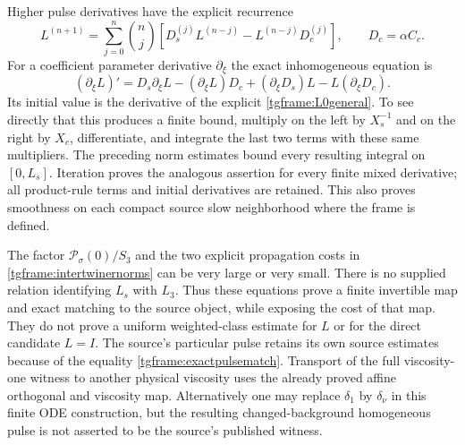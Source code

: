 Higher pulse derivatives have the explicit recurrence
\[
 L^{(n+1)}=
 \sum_{j=0}^n\binom nj\left[
 D_s^{(j)}L^{(n-j)}-L^{(n-j)}D_c^{(j)}\right],
 \qquad D_c=\alpha C_c .
\]
For a coefficient parameter derivative $\partial_\xi$ the exact
inhomogeneous equation is
\[
 (\partial_\xi L)'=D_s\partial_\xi L
       -(\partial_\xi L)D_c
       +(\partial_\xi D_s)L-L(\partial_\xi D_c).
\]
Its initial value is the derivative of the explicit
\eqref{tgframe:L0general}. To see directly that this produces a finite
bound, multiply on the left by $X_s^{-1}$ and on the right by $X_c$,
differentiate, and integrate the last two terms with these same
multipliers. The preceding norm estimates bound every resulting
integral on $[0,L_s]$. Iteration proves the analogous assertion for
every finite mixed derivative; all product-rule terms and initial
derivatives are retained. This also proves smoothness on each compact
source slow neighborhood where the frame is defined.

The factor $\mathcal P_\sigma(0)/S_3$ and the two explicit propagation
costs in \eqref{tgframe:intertwinernorms} can be very large or very small.
There is no supplied relation identifying $L_s$ with $L_3$.
Thus these equations prove a finite invertible map and exact matching
to the source object, while exposing the cost of that map. They do not
prove a uniform weighted-class estimate for $L$ or for the direct
candidate $L=I$. The source's particular pulse retains its own source
estimates because of the equality \eqref{tgframe:exactpulsematch}.
Transport of the full viscosity-one witness to another physical
viscosity uses the already proved affine orthogonal and viscosity map.
Alternatively one may replace $\delta_1$ by $\delta_\nu$ in this
finite ODE construction, but the resulting changed-background
homogeneous pulse is not asserted to be the source's published witness.
